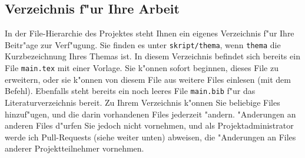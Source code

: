 \documentclass[a4paper,12pt]{article}
\begin{document}
\subsection{Verzeichnis f"ur Ihre Arbeit}
In der File-Hierarchie des Projektes steht Ihnen ein eigenes Verzeichnis
f"ur Ihre Beitr"age zur Verf"ugung.
Sie finden es unter \texttt{skript/thema}, wenn \texttt{thema}
die Kurzbezeichnung Ihres Themas ist.
In diesem Verzeichnis befindet sich bereits ein File \texttt{main.tex}
mit einer Vorlage.
Sie k"onnen sofort beginnen, dieses File zu erweitern, oder sie k"onnen
von diesem File aus weitere Files einlesen (mit dem \verb++
Befehl).
Ebenfalls steht bereits ein noch leeres File \texttt{main.bib} f"ur
das Literaturverzeichnis bereit.
Zu Ihrem Verzeichnis k"onnen Sie beliebige Files hinzuf"ugen, und
die darin vorhandenen Files jederzeit "andern.
"Anderungen an anderen Files d"urfen Sie jedoch nicht vornehmen, und als
Projektadministrator werde ich Pull-Requests (siehe weiter unten)
abweisen, die "Anderungen an Files anderer Projektteilnehmer vornehmen.
\end{document}
